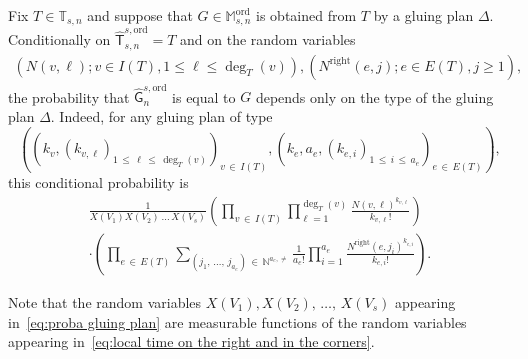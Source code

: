 \documentclass[10pt]{amsart}
\theoremstyle{definition}\newtheorem{defi}[theo]{Definition}\newtheorem{rema}[theo]{Remark}\newtheorem{exam}[theo]{Example}\newtheorem{exem}[theo]{Example}\newtheorem{nota}[theo]{Notation}
\newcommand{\ord}{\mathrm{ord}}
\newcommand{\Rightll}{\mathrm{right}}
\newcommand{\sG}{\mathsf{G}}
\newcommand{\sT}{\mathsf{T}}
\newcommand{\A}{\mathbb{T}}
\newcommand{\M}{\mathbb{M}}
\newcommand{\N}{\mathbb{N}}
\begin{document}
\begin{prop}\label{prop:proba of a gluing}
Fix $T \in \A_{s,n}$ and suppose that $G \in \M_{s,n}^{\ord}$ is obtained from $T$ by a gluing plan $\Delta$. Conditionally on $\widehat{\sT}_{s,n}^{s,\ord}=T$ and on the random variables
\begin{align}\label{eq:local time on the right and in the corners}
\left(N(v,\ell); v\in I(T), 1\leq \ell \leq \deg_T(v)\right), \left(N^{\Rightll}(e,j); e\in E(T), j\geq 1\right),
\end{align}
the probability that $\widehat{\sG}_{n}^{s,\ord}$ is equal to $G$ depends only on the type of the gluing plan $\Delta$. Indeed, for any gluing plan of type
\[
\left(\left(k_v,\left(k_{v,\ell}\right)_{1\,\leq\,\ell\,\leq\,\deg_T(v)}\right)_{v\,\in\,I(T)}, \left(k_e,a_e,\left(k_{e,i}\right)_{1\,\leq\,i\,\leq\,a_e}\right)_{e\,\in\,E(T)}\right),
\]
this conditional probability is
\begin{multline}\label{eq:proba gluing plan}
\frac{1}{X(V_1)X(V_2)\,\dots\,X(V_s)} \left(\prod_{v\,\in\,I(T)}\prod_{\ell=1}^{\deg_T(v)}\frac{N(v,\ell)^{k_{v,\ell}}}{k_{v,\ell}!}\right)\\
\cdot\left(\prod_{e\,\in\,E(T)}\sum_{(j_1,\,\dots,\,j_{a_e})\,\in\,\N^{a_e,\neq}} \frac{1}{a_e!} \prod_{i=1}^{a_e} \frac{N^{\Rightll}(e,j_{i})^{k_{e,i}}} {k_{e,i}!} \right).
\end{multline}
\end{prop}

Note that the random variables $X(V_1),X(V_2),\,\dots,\,X(V_s)$ appearing in~\eqref{eq:proba gluing plan} are measurable functions of the random variables appearing in~\eqref{eq:local time on the right and in the corners}.
\end{document}
